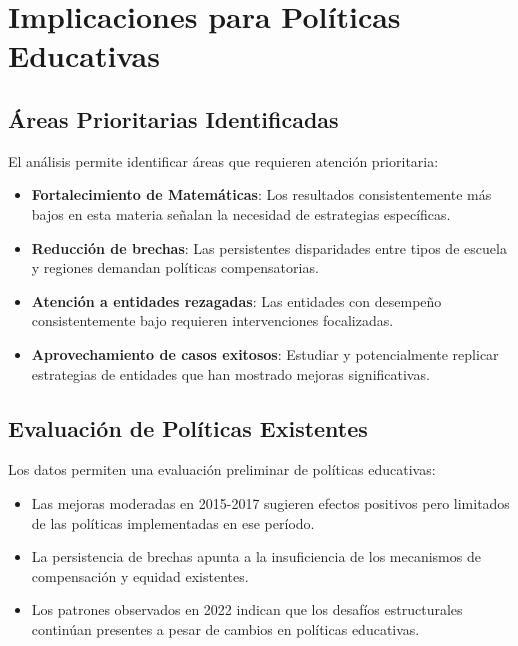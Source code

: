 \section{Implicaciones para Políticas Educativas}

\subsection{Áreas Prioritarias Identificadas}
El análisis permite identificar áreas que requieren atención prioritaria:

\begin{itemize}
    \item \textbf{Fortalecimiento de Matemáticas}: Los resultados consistentemente más bajos en esta materia señalan la necesidad de estrategias específicas.
    
    \item \textbf{Reducción de brechas}: Las persistentes disparidades entre tipos de escuela y regiones demandan políticas compensatorias.
    
    \item \textbf{Atención a entidades rezagadas}: Las entidades con desempeño consistentemente bajo requieren intervenciones focalizadas.
    
    \item \textbf{Aprovechamiento de casos exitosos}: Estudiar y potencialmente replicar estrategias de entidades que han mostrado mejoras significativas.
\end{itemize}

\subsection{Evaluación de Políticas Existentes}
Los datos permiten una evaluación preliminar de políticas educativas:

\begin{itemize}
    \item Las mejoras moderadas en 2015-2017 sugieren efectos positivos pero limitados de las políticas implementadas en ese período.
    
    \item La persistencia de brechas apunta a la insuficiencia de los mecanismos de compensación y equidad existentes.
    
    \item Los patrones observados en 2022 indican que los desafíos estructurales continúan presentes a pesar de cambios en políticas educativas.
\end{itemize}

